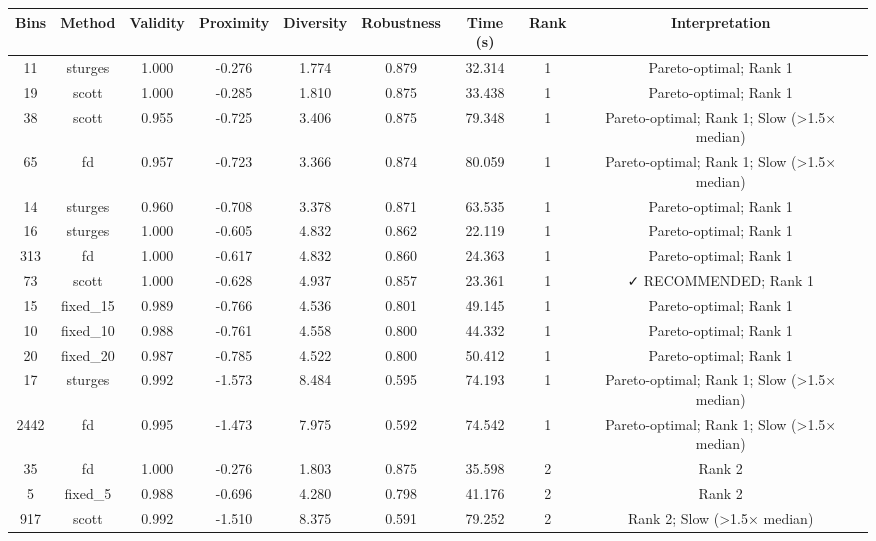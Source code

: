 \begin{tabular}{ccccccccc}
\toprule
 Bins &   Method &  Validity &  Proximity &  Diversity &  Robustness &  Time (s) &  Rank &                              Interpretation \\
\midrule
   11 &  sturges &     1.000 &     -0.276 &      1.774 &       0.879 &    32.314 &     1 &                      Pareto-optimal; Rank 1 \\
   19 &    scott &     1.000 &     -0.285 &      1.810 &       0.875 &    33.438 &     1 &                      Pareto-optimal; Rank 1 \\
   38 &    scott &     0.955 &     -0.725 &      3.406 &       0.875 &    79.348 &     1 & Pareto-optimal; Rank 1; Slow (>1.5× median) \\
   65 &       fd &     0.957 &     -0.723 &      3.366 &       0.874 &    80.059 &     1 & Pareto-optimal; Rank 1; Slow (>1.5× median) \\
   14 &  sturges &     0.960 &     -0.708 &      3.378 &       0.871 &    63.535 &     1 &                      Pareto-optimal; Rank 1 \\
   16 &  sturges &     1.000 &     -0.605 &      4.832 &       0.862 &    22.119 &     1 &                      Pareto-optimal; Rank 1 \\
  313 &       fd &     1.000 &     -0.617 &      4.832 &       0.860 &    24.363 &     1 &                      Pareto-optimal; Rank 1 \\
   73 &    scott &     1.000 &     -0.628 &      4.937 &       0.857 &    23.361 &     1 &                       ✓ RECOMMENDED; Rank 1 \\
   15 & fixed_15 &     0.989 &     -0.766 &      4.536 &       0.801 &    49.145 &     1 &                      Pareto-optimal; Rank 1 \\
   10 & fixed_10 &     0.988 &     -0.761 &      4.558 &       0.800 &    44.332 &     1 &                      Pareto-optimal; Rank 1 \\
   20 & fixed_20 &     0.987 &     -0.785 &      4.522 &       0.800 &    50.412 &     1 &                      Pareto-optimal; Rank 1 \\
   17 &  sturges &     0.992 &     -1.573 &      8.484 &       0.595 &    74.193 &     1 & Pareto-optimal; Rank 1; Slow (>1.5× median) \\
 2442 &       fd &     0.995 &     -1.473 &      7.975 &       0.592 &    74.542 &     1 & Pareto-optimal; Rank 1; Slow (>1.5× median) \\
   35 &       fd &     1.000 &     -0.276 &      1.803 &       0.875 &    35.598 &     2 &                                      Rank 2 \\
    5 &  fixed_5 &     0.988 &     -0.696 &      4.280 &       0.798 &    41.176 &     2 &                                      Rank 2 \\
  917 &    scott &     0.992 &     -1.510 &      8.375 &       0.591 &    79.252 &     2 &                 Rank 2; Slow (>1.5× median) \\
\bottomrule
\end{tabular}
